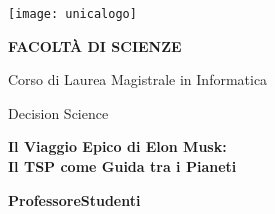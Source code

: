 \begin{spacing}{0.90}
\begin{center}
{\Large \thispagestyle{empty}}{\texttt{[image: unicalogo]}}\par
\end{center}
\end{spacing}

\noindent 
\begin{center}
\vspace{0.7cm}
\textbf{}\par
\end{center}{\LARGE \par}

\noindent 
\begin{center}
\textbf{\large FACOLT\`A DI SCIENZE}\par
\end{center}{\large \par}

\noindent
\begin{center}
{\large Corso di Laurea Magistrale in Informatica}\par  %
\end{center}{\large \par}

\vspace{1cm}

\begin{center}
\LARGE Decision Science\par
\end{center}{\LARGE \par}

\vspace{1cm}

\begin{center}
\textbf{\LARGE Il Viaggio Epico di Elon Musk: \\Il TSP come Guida tra i Pianeti}\par
\end{center}{\LARGE \par}

\begin{spacing}{0.90}
\vspace{2.8cm}
\textbf{\large Professore}{\large \hfill{}}\textbf{\large Studenti}{\large \par}
\end{spacing}

